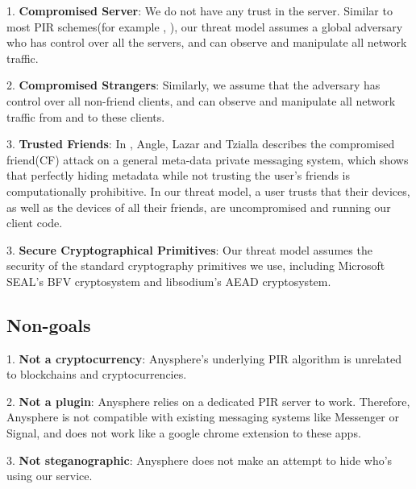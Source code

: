 


1. \textbf{Compromised Server}: We do not have any trust in the server. Similar to most PIR schemes(for example \cite{ahmad2021addra}, ), our threat model assumes a global adversary who has control over all the servers, and can observe and manipulate all network traffic.

2. \textbf{Compromised Strangers}: Similarly, we assume that the adversary has control over all non-friend clients, and can observe and manipulate all network traffic from and to these clients.

3. \textbf{Trusted Friends}: In \cite{angel2018s}, Angle, Lazar and Tzialla describes the compromised friend(CF) attack on a general meta-data private messaging system, which shows that perfectly hiding metadata while not trusting the user's friends is computationally prohibitive. In our threat model, a user trusts that their devices, as well as the devices of all their friends, are uncompromised and running our client code.  

3. \textbf{Secure Cryptographical Primitives}: Our threat model assumes the security of the standard cryptography primitives we use, including Microsoft SEAL's BFV cryptosystem and libsodium's AEAD cryptosystem. 



\subsection{Non-goals}
1. \textbf{Not a cryptocurrency}: Anysphere's underlying PIR algorithm is unrelated to blockchains and cryptocurrencies. 

2. \textbf{Not a plugin}: Anysphere relies on a dedicated PIR server to work. Therefore, Anysphere is not compatible with existing messaging systems like Messenger or Signal, and does not work like a google chrome extension to these apps. 

3. \textbf{Not steganographic}: Anysphere does not make an attempt to hide who's using our service.  

